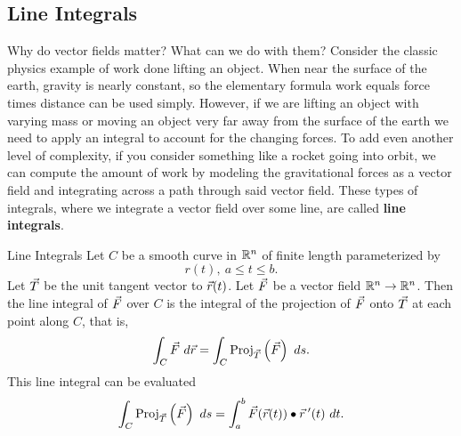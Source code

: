 \subsection{Line Integrals}
Why do vector fields matter? What can we do with them? Consider the classic physics example of work done lifting an object. When near the surface of the earth, gravity is nearly constant, so the elementary formula work equals force times distance can be used simply. However, if we are lifting an object with varying mass or moving an object very far away from the surface of the earth we need to apply an integral to account for the changing forces. To add even another level of complexity, if you consider something like a rocket going into orbit, we can compute the amount of work by modeling the gravitational forces as a vector field and integrating across a path through said vector field. These types of integrals, where we integrate a vector field over some line, are called \textbf{line integrals}.

\begin{definition}{Line Integrals}
Let $C$ be a smooth curve in $\mathbb{R}^n$ of finite length parameterized by $$r(t), \ a\leq t\leq b.$$ Let $\vec{T}$ be the unit tangent vector to $\vec{r}(t)$. Let $\vec{F}$ be a vector field  $\mathbb{R}^n\to\mathbb{R}^n$. Then the line integral of $\vec{F}$ over $C$ is the integral of the projection of $\vec{F}$ onto $\vec{T}$ at each point along $C$, that is, $$\int_C \vec{F} \ d\vec{r}=\int_C \mathrm{Proj}_{\vec{T}}\left({\vec{F}}\right) \ ds.$$
This line integral can be evaluated 
$$\int_C \mathrm{Proj}_{\vec{T}}\left({\vec{F}}\right) \ ds=\int_a^b \vec{F}(\vec{r}(t))\bullet\vec{r}\hspace{0.2em}'(t)\ dt.$$
\end{definition}

